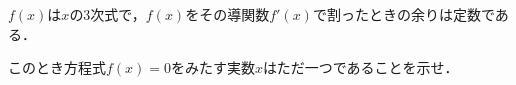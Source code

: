 \documentclass[../../main.tex]{subfiles}
\begin{document}
$f(x)$は$x$の3次式で，$f(x)$をその導関数$f'(x)$で割ったときの余りは定数である．

このとき方程式$f(x)=0$をみたす実数$x$はただ一つであることを示せ．
\end{document}
